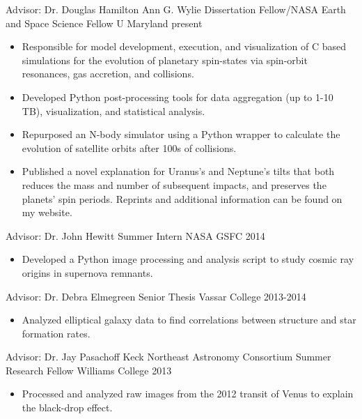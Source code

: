 \documentclass[]{awesome-cv}
\begin{document}
\begin{cventries}
		\cventry
		{Advisor: Dr. Douglas Hamilton}
		{Ann G. Wylie Dissertation Fellow/{\color{red}NASA Earth and Space Science Fellow}}
		{U Maryland}
		{present}
		{\vspace{-3mm}
			\begin{itemize}
				\item Responsible for model development, execution, and visualization of C based simulations for the evolution of planetary spin-states via spin-orbit resonances, gas accretion, and collisions. \vspace{0.7mm}
				\item Developed Python post-processing tools for data aggregation (up to 1-10 TB), visualization, and statistical analysis. \vspace{0.7mm}
				\item Repurposed an N-body simulator using a Python wrapper to calculate the evolution of satellite orbits after 100s of collisions. \vspace{0.7mm}
				\item Published a novel explanation for Uranus's and Neptune's tilts that both reduces the mass and number of subsequent impacts, and preserves the planets' spin periods. Reprints and additional information can be found on my website. \vspace{0.7mm}
			\end{itemize}
		}
	
	\vspace{-6mm}
	\cventry
	{Advisor: Dr. John Hewitt}
	{Summer Intern}
	{NASA GSFC}
	{2014}
	{\vspace{-3mm}
		\begin{itemize}
			\item Developed a Python image processing and analysis script to study cosmic ray origins in supernova remnants. 
		\end{itemize}
	}
	
	\vspace{-6mm}
	\cventry
	{Advisor: Dr. Debra Elmegreen}
	{Senior Thesis}
	{Vassar College}
	{2013-2014}
	{\vspace{-3mm}
		\begin{itemize}
			\item Analyzed elliptical galaxy data to find correlations between structure and star formation rates.
		\end{itemize}
	}
	
	\vspace{-6mm}
	\cventry
	{Advisor: Dr. Jay Pasachoff}
	{Keck Northeast Astronomy Consortium Summer Research Fellow}
	{Williams College}
	{2013}
	{\vspace{-3mm}
		\begin{itemize}
			\item Processed and analyzed raw images from the 2012 transit of Venus to explain the black-drop effect.
		\end{itemize}}
\end{cventries}
\end{document}
